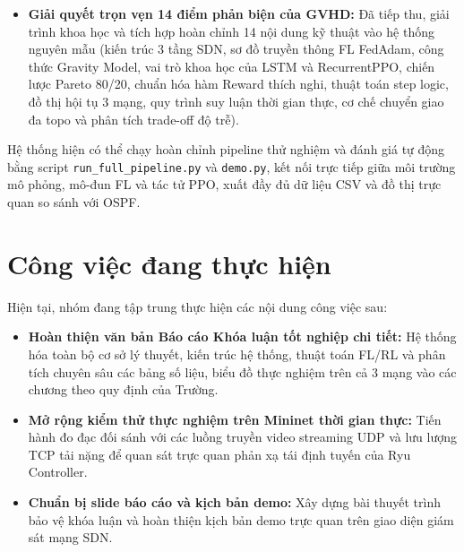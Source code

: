 \documentclass[11pt,a4paper]{article}
\begin{document}
\begin{itemize}[leftmargin=1.5em, itemsep=0.3ex]
    \item \textbf{Giải quyết trọn vẹn 14 điểm phản biện của GVHD:} Đã tiếp thu, giải trình khoa học và tích hợp hoàn chỉnh 14 nội dung kỹ thuật vào hệ thống nguyên mẫu (kiến trúc 3 tầng SDN, sơ đồ truyền thông FL FedAdam, công thức Gravity Model, vai trò khoa học của LSTM và RecurrentPPO, chiến lược Pareto 80/20, chuẩn hóa hàm Reward thích nghi, thuật toán step logic, đồ thị hội tụ 3 mạng, quy trình suy luận thời gian thực, cơ chế chuyển giao đa topo và phân tích trade-off độ trễ).
\end{itemize}

Hệ thống hiện có thể chạy hoàn chỉnh pipeline thử nghiệm và đánh giá tự động bằng script \texttt{run\_full\_pipeline.py} và \texttt{demo.py}, kết nối trực tiếp giữa môi trường mô phỏng, mô-đun FL và tác tử PPO, xuất đầy đủ dữ liệu CSV và đồ thị trực quan so sánh với OSPF.

\section{Công việc đang thực hiện}

Hiện tại, nhóm đang tập trung thực hiện các nội dung công việc sau:
\begin{itemize}[leftmargin=1.5em, itemsep=0.3ex]
    \item \textbf{Hoàn thiện văn bản Báo cáo Khóa luận tốt nghiệp chi tiết:} Hệ thống hóa toàn bộ cơ sở lý thuyết, kiến trúc hệ thống, thuật toán FL/RL và phân tích chuyên sâu các bảng số liệu, biểu đồ thực nghiệm trên cả 3 mạng vào các chương theo quy định của Trường.
    \item \textbf{Mở rộng kiểm thử thực nghiệm trên Mininet thời gian thực:} Tiến hành đo đạc đối sánh với các luồng truyền video streaming UDP và lưu lượng TCP tải nặng để quan sát trực quan phản xạ tái định tuyến của Ryu Controller.
    \item \textbf{Chuẩn bị slide báo cáo và kịch bản demo:} Xây dựng bài thuyết trình bảo vệ khóa luận và hoàn thiện kịch bản demo trực quan trên giao diện giám sát mạng SDN.
\end{itemize}

\end{document}
